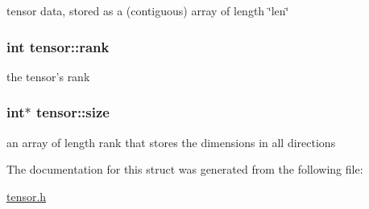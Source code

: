 tensor data, stored as a (contiguous) array of length \char`\"{}len\char`\"{} 

\hypertarget{structtensor_a7557914487d3688aae0cffa1527446dc}{
\subsubsection[{rank}]{\setlength{\rightskip}{0pt plus 5cm}int {\bf tensor::rank}}}
\label{structtensor_a7557914487d3688aae0cffa1527446dc}


the tensor's rank 

\hypertarget{structtensor_ab6fbe3c007384ce983219f08dfb2e7ca}{
\subsubsection[{size}]{\setlength{\rightskip}{0pt plus 5cm}int$\ast$ {\bf tensor::size}}}
\label{structtensor_ab6fbe3c007384ce983219f08dfb2e7ca}


an array of length rank that stores the dimensions in all directions 



The documentation for this struct was generated from the following file:\begin{DoxyCompactItemize}
\item 
\hyperlink{tensor_8h}{tensor.h}\end{DoxyCompactItemize}
